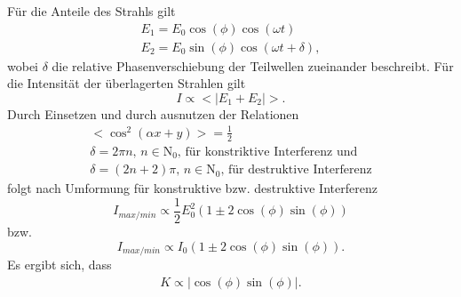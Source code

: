 Für die Anteile des Strahls gilt
\begin{gather*}
  E_1 = E_0\cos(\phi)\cos(\omega t) \\
  E_2 = E_0\sin(\phi)\cos(\omega t + \delta),
\end{gather*}
wobei $\delta$ die relative Phasenverschiebung der Teilwellen zueinander beschreibt.
Für die Intensität der überlagerten Strahlen gilt
\begin{equation*}
  I \propto <|E_1 + E_2|>.
\end{equation*}
Durch Einsetzen und durch ausnutzen der Relationen
\begin{gather*}
  <\cos^2(\alpha x + y)> = \frac{1}{2} \\
  \delta = 2\pi n , \, n\in\mathrm{N}_0,\, \text{für konstriktive Interferenz und} \\
  \delta = (2n+2)\pi,\, n\in\mathrm{N}_0,\, \text{für destruktive Interferenz}
\end{gather*}
folgt nach Umformung für konstruktive bzw. destruktive Interferenz
\begin{equation*}
  I_{max/min} \propto \frac{1}{2}E_0^2 (1 \pm 2\cos(\phi)\sin(\phi))
\end{equation*}
bzw.
\begin{equation}
  I_{max/min} \propto I_0(1 \pm 2\cos(\phi)\sin(\phi)).
\end{equation}
Es ergibt sich, dass
\begin{align*}
  K \propto |\cos(\phi)\sin(\phi)|.
\end{align*}

